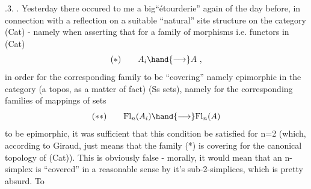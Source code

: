 .3.
. Yesterday there occured to me a big``étourderie'' again of the day
before, in connection with a reflection on a suitable ``natural'' site
structure on the category (Cat) - namely when asserting that for a
family of morphisms i.e. functors in (Cat)
\[ (*) \qquad A_i \hand{\longrightarrow} A \ , \]
in order for the corresponding family to be ``covering'' namely epimorphic
in the category (a topos, as a matter of fact) (Ss sets), namely for
the corresponding families of mappings of sets
\[ (**) \qquad \mathrm{Fl}_n(A_i) \hand{\longrightarrow} \mathrm{Fl}_n(A) \]
to be epimorphic, it was sufficient that this condition be satisfied
for n=2 (which, according to Giraud, just means that the family (*)
is covering for the canonical topology of (Cat)). This is obviously
false - morally, it would mean that an n-simplex is ``covered'' in a
reasonable sense by it's sub-2-simplices, which is pretty absurd. To
